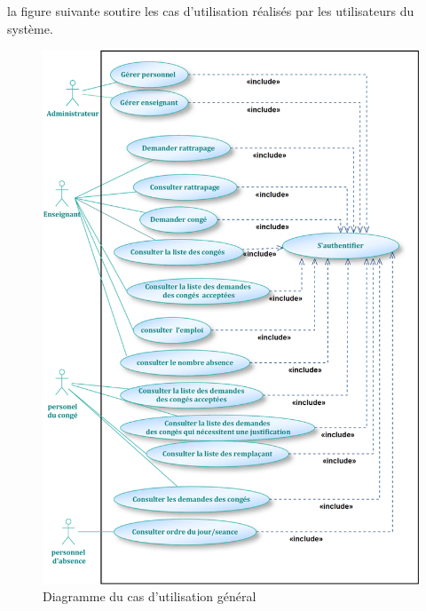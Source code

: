 \documentclass[12 pt ]{report}
\begin{document}
la figure  suivante soutire les cas d’utilisation réalisés par les utilisateurs du système.
\begin{figure}[h]
 \begin{center}
\includegraphics[width= 18 cm ,height= 17 cm]{f.PNG}
\caption{Diagramme du cas d’utilisation général}
\end{center}
\end{figure}
\newpage
\end{document}
